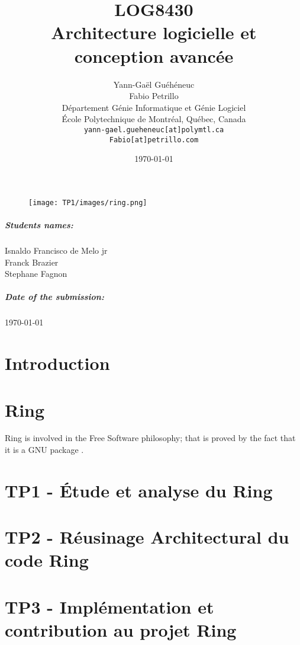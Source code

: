 \documentclass[11pt]{report}
\title{LOG8430\\Architecture logicielle et conception avanc\'{e}e}
\author{
    Yann-Gaël Guéhéneuc \\
    Fabio Petrillo \\
    D\'{e}partement G\'{e}nie Informatique et G\'{e}nie Logiciel \\
    \'{E}cole Polytechnique de Montr\'{e}al, Qu\'{e}bec, Canada \\
    \texttt{yann-gael.gueheneuc[at]polymtl.ca} \\
    \texttt{Fabio[at]petrillo.com}
}
\date{\today}
\def\auteur{}
\begin{document}
{\let\newpage\relax\maketitle}
\begin{figure}[ht!]
\centering
\texttt{[image: TP1/images/ring.png]}
\end{figure}

\paragraph{Students names:}
\centering
\paragraph{} \auteur
Isnaldo Francisco de Melo jr\\
Franck Brazier\\
Stephane Fagnon\\

\centering

\paragraph{Date of the submission:}
\today
\newpage

\tableofcontents
\newpage

\justify

\chapter*{Introduction}


{\let\clearpage\relax \chapter*{Ring}

Ring is involved in the Free Software philosophy; that is proved  by the fact that it is a GNU\cite{GNU} package \cite{official_blog}. 
}

\chapter{TP1 - Étude et analyse du Ring }

\newpage
\chapter{TP2 - Réusinage Architectural du code Ring}

\newpage
\chapter{TP3 - Implémentation et contribution au projet Ring }

\end{document}
